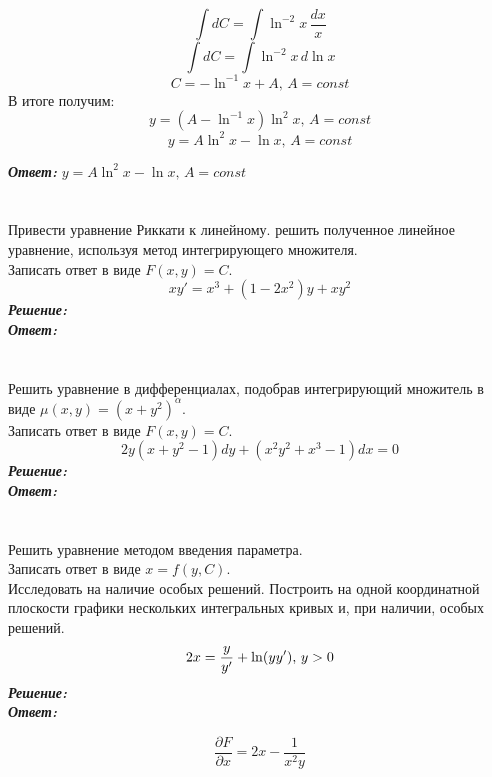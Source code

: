 \documentclass[a5paper, 10pt]{article}
\theoremstyle{definition}
\theoremstyle{plain}
\theoremstyle{remark}
\begin{document}
\begin{equation*}
\int dC  = \int \ln ^{-2} x  \,\frac{dx}{x} 
\end{equation*}
\begin{equation*}
\int dC  = \int \ln ^{-2} x \, d \ln x
\end{equation*}
\begin{equation*}
C  =  - \ln ^{-1} x + A, \, A = const
\end{equation*}
В итоге получим:
\begin{equation*}
  y = (A - \ln ^{-1} x  )  \ln ^2 x, \, A = const
\end{equation*}
\begin{equation*}
  y = A\ln ^2 x - \ln x , \, A = const
\end{equation*}

\textit{\textbf{Ответ:}} $  y = A\ln ^2 x - \ln x , \, A = const$

\newpage
\section{}
Привести уравнение Риккати к линейному. решить полученное линейное уравнение, используя метод интегрирующего множителя.\\
Записать ответ в виде $F(x, y) = C$.
\begin{equation*}
xy' = x^3 + (1 - 2x^2)y + xy^2
\end{equation*}
\textit{\textbf{Решение:}}\\


\textit{\textbf{Ответ:}}


\newpage
\section{}
Решить уравнение в дифференциалах, подобрав интегрирующий множитель в виде $\mu (x, y) = (x+y^2)^{\alpha}$.\\
Записать ответ в виде $F(x, y) = C$.
\begin{equation*}
2y(x + y^2 - 1) dy + (x^2y^2+x^3 - 1)dx = 0
\end{equation*}
\textit{\textbf{Решение:}}\\


\textit{\textbf{Ответ:}}

\newpage
\section{}
Решить уравнение методом введения параметра. \\
Записать ответ в виде $x = f(y, C)$.\\
Исследовать на наличие особых решений. Построить на одной координатной плоскости графики нескольких интегральных кривых и, при наличии, особых решений.
\begin{equation*}
2x = \frac{y}{y'} + \ln (yy'), \, y >0\\
\end{equation*}
\textit{\textbf{Решение:}}\\


\textit{\textbf{Ответ:}}


\begin{equation*}
\frac{\partial F}{\partial x} =  2x - \frac{1}{x^2y}
\end{equation*}
\end{document}
